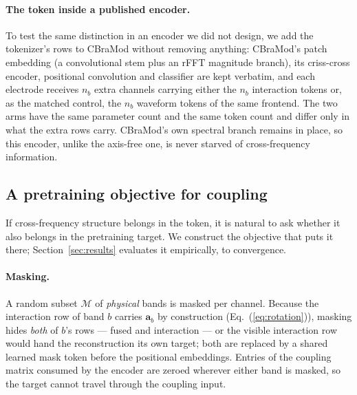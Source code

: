 \paragraph{The token inside a published encoder.}
To test the same distinction in an encoder we did not design, we add the
tokenizer's rows to CBraMod \citep{wang2025cbramod} without removing
anything: CBraMod's patch embedding (a convolutional stem plus an rFFT
magnitude branch), its criss-cross encoder, positional convolution and
classifier are kept verbatim, and each electrode receives $n_b$ extra
channels carrying either the $n_b$ interaction tokens or, as the matched
control, the $n_b$ waveform tokens of the same frontend. The two arms have
the same parameter count and the same token count and differ only in what
the extra rows carry. CBraMod's own spectral branch remains in place, so
this encoder, unlike the axis-free one, is never starved of
cross-frequency information.

\subsection{A pretraining objective for coupling}
\label{sec:objective}

If cross-frequency structure belongs in the token, it is natural to ask
whether it also belongs in the pretraining target. We construct the
objective that puts it there; Section~\ref{sec:results} evaluates it
empirically, to convergence.

\paragraph{Masking.} A random subset $\mathcal{M}$ of \emph{physical}
bands is masked per channel. Because the interaction row of band $b$
carries $\mathbf{a}_b$ by construction (Eq.~(\ref{eq:rotation})), masking
hides \emph{both} of $b$'s rows --- fused and interaction --- or the
visible interaction row would hand the reconstruction its own target; both
are replaced by a shared learned mask token before the positional
embeddings. Entries of the coupling matrix consumed by the encoder are
zeroed wherever either band is masked, so the target cannot travel through
the coupling input.

